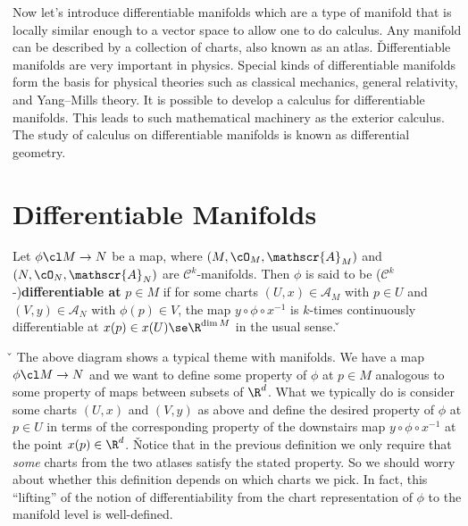 Now let's introduce differentiable manifolds which are a type of manifold that is locally similar enough to a vector
space to allow one to do calculus. Any manifold can be described by a collection of charts, also known as an atlas. \v

Differentiable manifolds are very important in physics. Special kinds of differentiable manifolds form the basis for
physical theories such as classical mechanics, general relativity, and Yang–Mills theory. It is possible to develop a
calculus for differentiable manifolds. This leads to such mathematical machinery as the exterior calculus. The study
of calculus on differentiable manifolds is known as differential geometry.

\section{Differentiable Manifolds}

Let $\phi\cl M\to N$ be a map, where $(M,\cO_M,\mathscr{A}_M)$ and $(N,\cO_N,\mathscr{A}_N)$ are
$\mathcal{C}^k$-manifolds. Then $\phi$ is said to be ($\mathcal{C}^k$-)\textbf{differentiable at} $p\in M$ if for
some charts $(U,x)\in\mathscr{A}_M$ with $p\in U$ and $(V,y)\in\mathscr{A}_N$ with $\phi(p)\in V$, the map
$y\circ\phi\circ x^{-1}$ is $k$-times continuously differentiable at $x(p)\in x(U)\se\R^{\dim M}$ in the usual sense. \v
\bse
{}
\ese

\v

\ed
The above diagram shows a typical theme with manifolds. We have a map $\phi\cl M\to N$ and we want to define some
property of $\phi$ at $p\in M$ analogous to some property of maps between subsets of $\R^d$. What we typically do is
consider some charts $(U,x)$ and $(V,y)$ as above and define the desired property of $\phi$ at $p\in U$ in terms of
the corresponding property of the downstairs map $y\circ\phi\circ x^{-1}$ at the point $x(p)\in\R^d$. \v

Notice that in the previous definition we only require that \emph{some} charts from the two atlases satisfy the
stated property. So we should worry about whether this definition depends on which charts we pick. In fact, this
``lifting'' of the notion of differentiability from the chart representation of $\phi$ to the manifold level is
well-defined.

